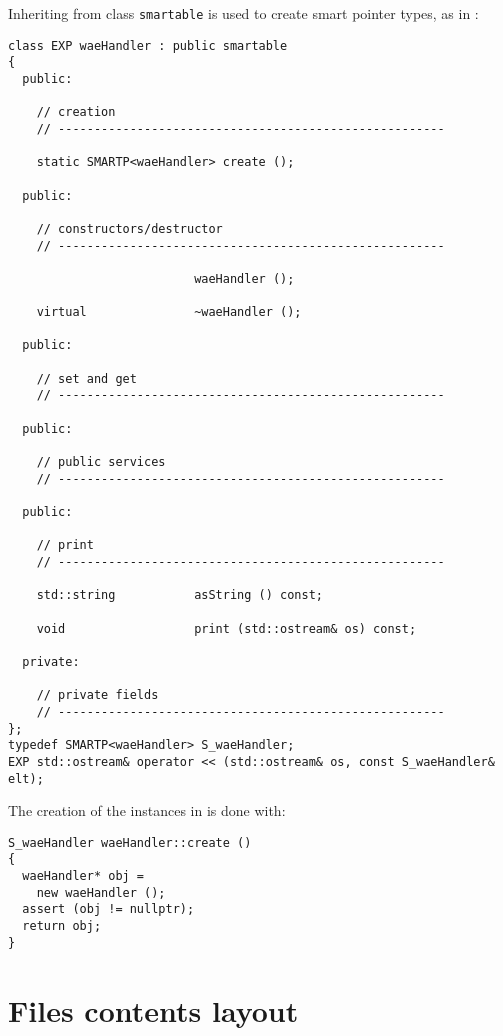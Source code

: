 Inheriting from class   {\tt smartable} is used to create smart pointer types, as in :
\begin{lstlisting}[language=CPlusPlus]
class EXP waeHandler : public smartable
{
  public:

    // creation
    // ------------------------------------------------------

    static SMARTP<waeHandler> create ();

  public:

    // constructors/destructor
    // ------------------------------------------------------

                          waeHandler ();

    virtual               ~waeHandler ();

  public:

    // set and get
    // ------------------------------------------------------

  public:

    // public services
    // ------------------------------------------------------

  public:

    // print
    // ------------------------------------------------------

    std::string           asString () const;

    void                  print (std::ostream& os) const;

  private:

    // private fields
    // ------------------------------------------------------
};
typedef SMARTP<waeHandler> S_waeHandler;
EXP std::ostream& operator << (std::ostream& os, const S_waeHandler& elt);
\end{lstlisting}

The creation of the instances in  is done with:
\begin{lstlisting}[language=CPlusPlus]
S_waeHandler waeHandler::create ()
{
  waeHandler* obj =
    new waeHandler ();
  assert (obj != nullptr);
  return obj;
}
\end{lstlisting}


\section{Files contents layout}

